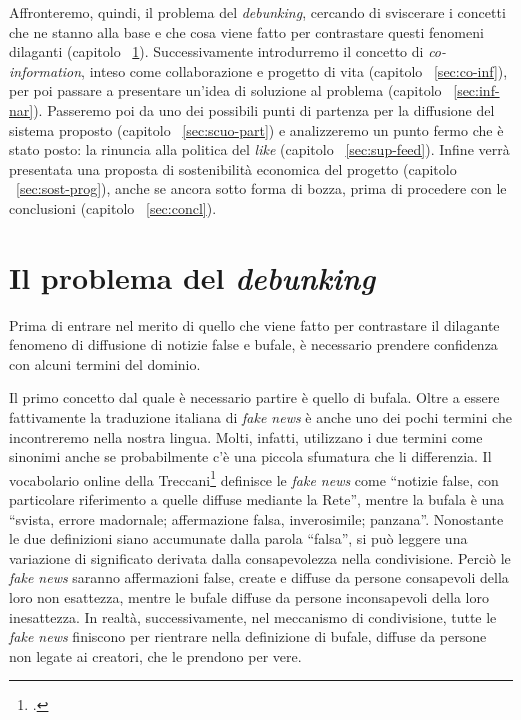 \documentclass{article}
\begin{document}
 Affronteremo, quindi, il problema del \textit{debunking}, cercando di sviscerare i concetti che ne stanno alla base e che cosa viene fatto per contrastare questi fenomeni dilaganti (capitolo ~\ref{sec:prob-deb}). Successivamente introdurremo il concetto di \textit{co-information}, inteso come collaborazione e progetto di vita (capitolo ~\ref{sec:co-inf}), per poi passare a presentare un’idea di soluzione al problema (capitolo ~\ref{sec:inf-nar}). Passeremo poi da uno dei possibili punti di partenza per la diffusione del sistema proposto (capitolo ~\ref{sec:scuo-part}) e analizzeremo un punto fermo che è stato posto: la rinuncia alla politica del \textit{like} (capitolo ~\ref{sec:sup-feed}). Infine verrà presentata una proposta di sostenibilità economica del progetto (capitolo ~\ref{sec:sost-prog}), anche se ancora sotto forma di bozza, prima di procedere con le conclusioni (capitolo ~\ref{sec:concl}).

\section{Il problema del \textit{debunking}}
\label{sec:prob-deb}

Prima di entrare nel merito di quello che viene fatto per contrastare il dilagante fenomeno di diffusione di notizie false e bufale, è necessario prendere confidenza con alcuni termini del dominio. 

Il primo concetto dal quale è necessario partire è quello di bufala. Oltre a essere fattivamente la traduzione italiana di \textit{fake news} è anche uno dei pochi termini che incontreremo nella nostra lingua. Molti, infatti, utilizzano i due termini come sinonimi anche se probabilmente c’è una piccola sfumatura che li differenzia. Il vocabolario online della Treccani\footcite{noauthor_treccani_nodate} definisce le \textit{fake news} come “notizie false, con particolare riferimento a quelle diffuse mediante la Rete”, mentre la bufala è una “svista, errore madornale; affermazione falsa, inverosimile; panzana”. Nonostante le due definizioni siano accumunate dalla parola “falsa”, si può leggere una variazione di significato derivata dalla consapevolezza nella condivisione. Perciò le \textit{fake news} saranno affermazioni false, create e diffuse da persone consapevoli della loro non esattezza, mentre le bufale diffuse da persone inconsapevoli della loro inesattezza. In realtà, successivamente, nel meccanismo di condivisione, tutte le \textit{fake news} finiscono per rientrare nella definizione di bufale, diffuse da persone non legate ai creatori, che le prendono per vere.
\end{document}
